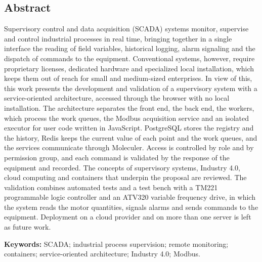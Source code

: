 \newpage %
\thispagestyle{empty} %
\clearpage %

\begin{center}
    \section*{Abstract} %
\end{center}

\par Supervisory control and data acquisition (SCADA) systems monitor, supervise and control industrial processes in real time, bringing together in a single interface the reading of field variables, historical logging, alarm signaling and the dispatch of commands to the equipment. Conventional systems, however, require proprietary licenses, dedicated hardware and specialized local installation, which keeps them out of reach for small and medium-sized enterprises. In view of this, this work presents the development and validation of a supervisory system with a service-oriented architecture, accessed through the browser with no local installation. The architecture separates the front end, the back end, the workers, which process the work queues, the Modbus acquisition service and an isolated executor for user code written in JavaScript. PostgreSQL stores the registry and the history, Redis keeps the current value of each point and the work queues, and the services communicate through Moleculer. Access is controlled by role and by permission group, and each command is validated by the response of the equipment and recorded. The concepts of supervisory systems, Industry 4.0, cloud computing and containers that underpin the proposal are reviewed. The validation combines automated tests and a test bench with a TM221 programmable logic controller and an ATV320 variable frequency drive, in which the system reads the motor quantities, signals alarms and sends commands to the equipment. Deployment on a cloud provider and on more than one server is left as future work.

\leavevmode\newline
\par\textbf{Keywords:} SCADA; industrial process supervision; remote monitoring; containers; service-oriented architecture; Industry 4.0; Modbus. %

\thispagestyle{empty} %
\clearpage %
